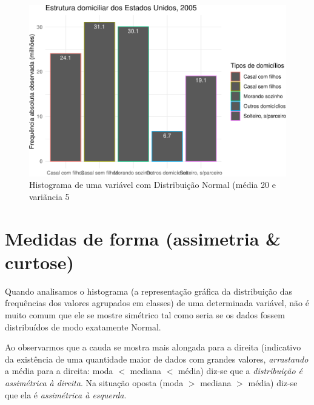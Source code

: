 \documentclass[
]{book}
\begin{document}
\begin{figure}

{\centering \includegraphics{apostila_files/figure-latex/unnamed-chunk-48-1} 

}

\caption{Histograma de uma variável com Distribuição Normal (média 20 e variãncia 5}\label{fig:unnamed-chunk-48}
\end{figure}

\hypertarget{medidas-de-forma-assimetria-curtose}{%
\section{Medidas de forma (assimetria \& curtose)}\label{medidas-de-forma-assimetria-curtose}}

Quando analisamos o histograma (a representação gráfica da distribuição das frequências dos valores agrupados em classes) de uma determinada variável, não é muito comum que ele se mostre simétrico tal como seria se os dados fossem distribuídos de modo exatamente Normal.

Ao observarmos que a cauda se mostra mais alongada para a direita (indicativo da existência de uma quantidade maior de dados com grandes valores, \emph{arrastando} a média para a direita: moda \(<\) mediana \(<\) média) diz-se que a \emph{distribuição é assimétrica à direita}. Na situação oposta (moda \(>\) mediana \(>\) média) diz-se que ela é \emph{assimétrica à esquerda}.
\end{document}

